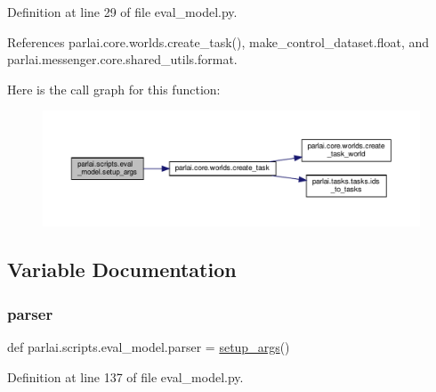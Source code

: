Definition at line 29 of file eval\+\_\+model.\+py.



References parlai.\+core.\+worlds.\+create\+\_\+task(), make\+\_\+control\+\_\+dataset.\+float, and parlai.\+messenger.\+core.\+shared\+\_\+utils.\+format.

Here is the call graph for this function\+:
\nopagebreak
\begin{figure}[H]
\begin{center}
\leavevmode
\includegraphics[width=350pt]{namespaceparlai_1_1scripts_1_1eval__model_a2eaba0aa76c4d83e2a0f7f77c23479c8_cgraph}
\end{center}
\end{figure}


\subsection{Variable Documentation}
\mbox{\label{namespaceparlai_1_1scripts_1_1eval__model_ad0eac535b81763908ecc3cc63c12c885}} 
\subsubsection{\texorpdfstring{parser}{parser}}
{\footnotesize\ttfamily def parlai.\+scripts.\+eval\+\_\+model.\+parser = \hyperlink{namespaceparlai_1_1scripts_1_1eval__model_a2eaba0aa76c4d83e2a0f7f77c23479c8}{setup\+\_\+args}()}



Definition at line 137 of file eval\+\_\+model.\+py.

